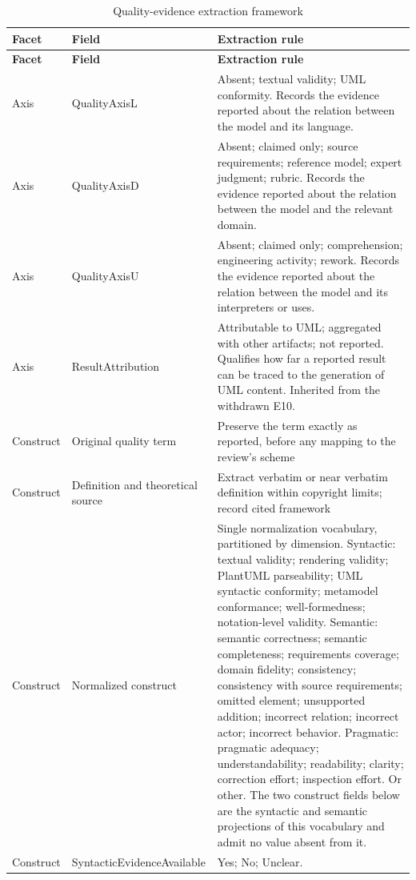 \begin{longtable}{p{} p{} p{}}
\caption{Quality-evidence extraction framework}
\label{tab:protocol_quality_evidence_extraction}\\
\toprule
\textbf{Facet} & \textbf{Field} & \textbf{Extraction rule} \\
\midrule
\endfirsthead
\toprule
\textbf{Facet} & \textbf{Field} & \textbf{Extraction rule} \\
\midrule
\endhead
Axis & QualityAxisL & Absent; textual validity; UML conformity. Records the evidence reported about the relation between the model and its language. \\
Axis & QualityAxisD & Absent; claimed only; source requirements; reference model; expert judgment; rubric. Records the evidence reported about the relation between the model and the relevant domain. \\
Axis & QualityAxisU & Absent; claimed only; comprehension; engineering activity; rework. Records the evidence reported about the relation between the model and its interpreters or uses. \\
Axis & ResultAttribution & Attributable to UML; aggregated with other artifacts; not reported. Qualifies how far a reported result can be traced to the generation of UML content. Inherited from the withdrawn E10. \\
Construct & Original quality term & Preserve the term exactly as reported, before any mapping to the review's scheme \\
Construct & Definition and theoretical source & Extract verbatim or near verbatim definition within copyright limits; record cited framework \\
Construct & Normalized construct & Single normalization vocabulary, partitioned by dimension. Syntactic: textual validity; rendering validity; PlantUML parseability; UML syntactic conformity; metamodel conformance; well-formedness; notation-level validity. Semantic: semantic correctness; semantic completeness; requirements coverage; domain fidelity; consistency; consistency with source requirements; omitted element; unsupported addition; incorrect relation; incorrect actor; incorrect behavior. Pragmatic: pragmatic adequacy; understandability; readability; clarity; correction effort; inspection effort. Or other. The two construct fields below are the syntactic and semantic projections of this vocabulary and admit no value absent from it. \\
Construct & SyntacticEvidenceAvailable & Yes; No; Unclear. \\

\end{longtable}
